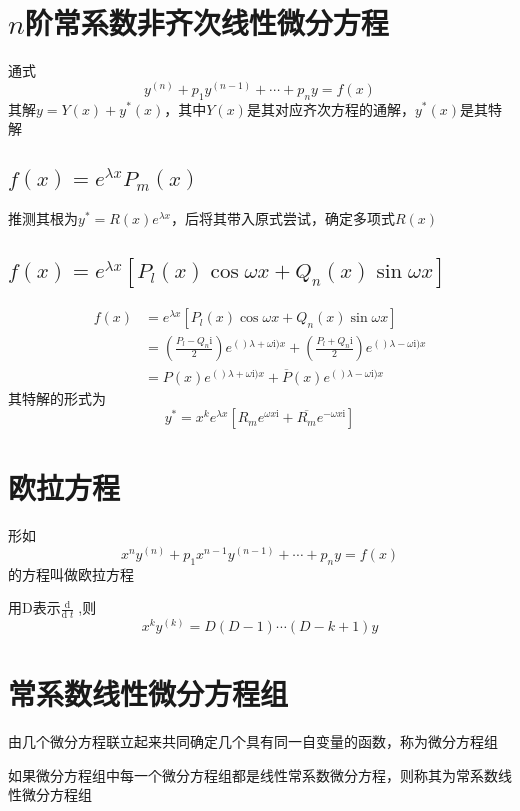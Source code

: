 \documentclass[UTF8]{ctexart}
\newcommand{\dif}[1]{\text{d}\;\!#1}
\newcommand{\dev}[1]{\frac{\text{d}}{\dif{#1}}\;\!}
\begin{document}
\section*{$n$阶常系数非齐次线性微分方程}

\bigskip
通式
\[y^{(n)}+p_1y^{(n-1)}+\cdots+p_ny=f(x)\]
其解$y=Y(x)+y^*(x)$，其中$Y(x)$是其对应齐次方程的通解，$y^*(x)$是其特解
\subsection*{$f(x)=e^{\lambda x}P_m(x)$}
推测其根为$y^*=R(x)e^{\lambda x}$，后将其带入原式尝试，确定多项式$R(x)$

\subsection{$f(x)=e^{\lambda x}[P_l(x)\cos\omega x+Q_n(x)\sin\omega x]$}
\begin{align*}
f(x) &= e^{\lambda x}[P_l(x)\cos\omega x+Q_n(x)\sin\omega x] \\
&= (\frac{P_l-Q_n\text{i}}{2})e^{()\lambda+\omega\text{i})x}+(\frac{P_l+Q_n\text{i}}{2})e^{()\lambda-\omega\text{i})x}\\
&= P(x)e^{()\lambda+\omega\text{i})x}+\overline{P}(x)e^{()\lambda-\omega\text{i})x}
\end{align*}
其特解的形式为
\[y^*=x^ke^{\lambda x}[R_me^{\omega x\text{i}}+\overline{R_m}e^{-\omega x\text{i}}]\]
\bigskip
\bigskip

\section*{欧拉方程}

\bigskip

形如
\[ x^ny^{(n)}+p_1x^{n-1}y^{(n-1)}+\cdots+p_ny=f(x) \]
的方程叫做欧拉方程

用$\text{D}$表示$\dev{t}$,则
\[x^ky^{(k)}=D(D-1)\cdots(D-k+1)y\]
\bigskip
\bigskip

\section*{常系数线性微分方程组}

\bigskip
由几个微分方程联立起来共同确定几个具有同一自变量的函数，称为微分方程组

如果微分方程组中每一个微分方程组都是线性常系数微分方程，则称其为常系数线性微分方程组
\end{document}
